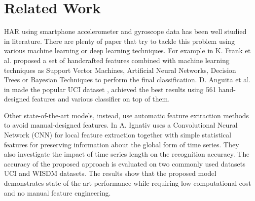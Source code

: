 
\section{Related Work}
\label{sec:related-work}

HAR using smartphone accelerometer and gyroscope data has been well
studied in literature. There are plenty of paper that try to tackle
this problem using various machine learning or deep learning
techniques. For example in \cite{frank2010reliable} K. Frank et
al. proposed a set of handcrafted features combined with machine
learning techniques as Support Vector Machines, Artificial Neural
Networks, Decision Trees or Bayesian Techniques to perform the final
classification. D. Anguita et al. in \cite{anguita2013public} made the
popular UCI dataset \cite{UCI}, achieved the best results using 561
hand-designed features and various classifier on top of them.

Other state-of-the-art models, instead, use automatic feature
extraction methods to avoid manual-designed features. In
\cite{ignatov2018real} A. Ignativ uses a Convolutional Neural Network
(CNN) for local feature extraction together with simple statistical
features for preserving information about the global form of time
series. They also investigate the impact of time series length on the
recognition accuracy. The accuracy of the proposed approach is
evaluated on two commonly used datasets UCI \cite{UCI} and WISDM
\cite{WISDM} datasets. The results show that the proposed model
demonstrates state-of-the-art performance while requiring low
computational cost and no manual feature engineering.

